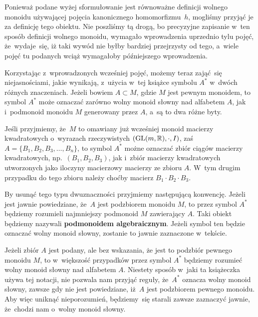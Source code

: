 \documentclass[a4paper,11pt]{article}
\begin{document}
Ponieważ podane wyżej sformułowanie jest równoważne definicji wolnego
monoidu używającej pojęcia kanonicznego homomorfizmu~$h$, mogliśmy
przyjąć je za definicję tego obiektu. Nie poszliśmy tą drogą, bo
precyzyjne zapisanie w~ten sposób definicji wolnego monoidu, wymagało
wprowadzenia uprzednio tylu pojęć, że~wydaje~się, iż taki wywód nie
byłby bardziej przejrzysty od tego, a~wiele pojęć tu podanych wciąż
wymagałoby późniejszego wprowadzenia.

\vspace{\spaceFour}





 Korzystając z~wprowadzonych wcześniej pojęć, możemy
teraz zająć~się niejasnościami, jakie wynikają, z~użycia w~tej książce
symbolu $A^{ * }$ w~dwóch różnych znaczeniach. Jeżeli bowiem
$A \subset M$, gdzie $M$ jest pewnym monoidem, to symbol $A^{ * }$
może oznaczać zarówno wolny monoid słowny nad alfabetem $A$, jak
i~podmonoid monoidu $M$ generowany przez $A$, a~są to dwa różne byty.

Jeśli przyjmiemy, że~$M$ to omawiany już wcześniej monoid macierzy
kwadratowych o~wyrazach rzeczywistych $( \mathrm{GL}( m, \mathbb{R} ), \cdot, I )$,
zaś $A = \{ B_{ 1 }, B_{ 2 }, B_{ 3 }, \ldots, B_{ n } \}$, to symbol
$A^{ * }$ możne oznaczać zbiór ciągów macierzy kwadratowych,
np.~$( B_{ 1 }, B_{ 2 }, B_{ 3 } )$, jak i~zbiór macierzy kwadratowych
utworzonych jako iloczyny macierzowy macierzy ze zbioru $A$. W~tym
drugim przypadku do tego zbioru należy choćby macierz
$B_{ 1 } \cdot B_{ 2 } \cdot B_{ 3 }$.

By usunąć tego typu dwuznaczności przyjmiemy następującą konwencję.
Jeżeli jest jawnie powiedziane, że~$A$ jest podzbiorem monoidu $M$, to
przez symbol $A^{ * }$ będziemy rozumieli najmniejszy podmonoid $M$
zawierający $A$. Taki obiekt będziemy nazywali \textbf{podmonoidem
  algebraicznym}. Jeżeli symbol ten będzie oznaczać wolny monoid słowny,
zostanie to jawnie zaznaczone w~tekście.

Jeżeli zbiór $A$ jest podany, ale bez wskazania, że jest to podzbiór
pewnego monoidu $M$, to w~większość przypadków przez symbol $A^{ * }$
będziemy rozumieć wolny monoid słowny nad alfabetem $A$. Niestety sposób
w~jaki ta książeczka używa tej notacji, nie pozwala nam przyjąć reguły,
że~$A^{ * }$ oznacza wolny monoid słowny, zawsze gdy nie jest powiedziane,
iż~$A$ jest podzbiorem pewnego monoidu. Aby więc uniknąć nieporozumień,
będziemy~się starali zawsze zaznaczyć jawnie, że~chodzi nam o~wolny monoid
słowny.
\end{document}
